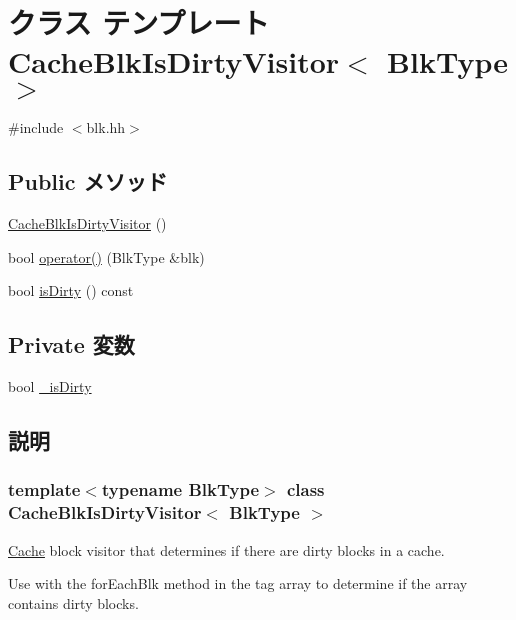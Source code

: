 \hypertarget{classCacheBlkIsDirtyVisitor}{
\section{クラス テンプレート CacheBlkIsDirtyVisitor$<$ BlkType $>$}
\label{classCacheBlkIsDirtyVisitor}
}


{\ttfamily \#include $<$blk.hh$>$}\subsection*{Public メソッド}
\begin{DoxyCompactItemize}
\item 
\hyperlink{classCacheBlkIsDirtyVisitor_ab3642c3ba67d65228f3b7e704f3ec1c8}{CacheBlkIsDirtyVisitor} ()
\item 
bool \hyperlink{classCacheBlkIsDirtyVisitor_af8429f9c21cde9e60c7fe57e0f14a0ef}{operator()} (BlkType \&blk)
\item 
bool \hyperlink{classCacheBlkIsDirtyVisitor_ad66f409af3c387e166ff7ee95169b7b6}{isDirty} () const 
\end{DoxyCompactItemize}
\subsection*{Private 変数}
\begin{DoxyCompactItemize}
\item 
bool \hyperlink{classCacheBlkIsDirtyVisitor_ab67cbd644e8217ff651799d99e971594}{\_\-isDirty}
\end{DoxyCompactItemize}


\subsection{説明}
\subsubsection*{template$<$typename BlkType$>$ class CacheBlkIsDirtyVisitor$<$ BlkType $>$}

\hyperlink{classCache}{Cache} block visitor that determines if there are dirty blocks in a cache.

Use with the forEachBlk method in the tag array to determine if the array contains dirty blocks. 

